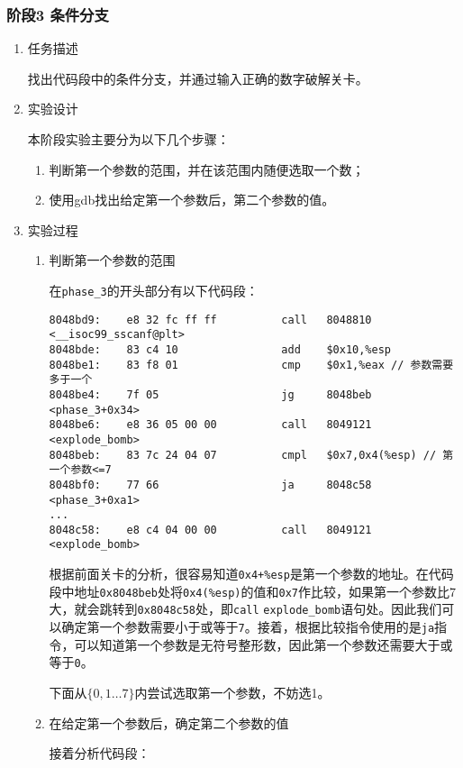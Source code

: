\documentclass{paper}
\begin{document}
\subsubsection{阶段3 条件分支}
\begin{enumerate}
\item 任务描述

找出代码段中的条件分支，并通过输入正确的数字破解关卡。

\item 实验设计

本阶段实验主要分为以下几个步骤：
\begin{enumerate}
\item 判断第一个参数的范围，并在该范围内随便选取一个数；
\item 使用gdb找出给定第一个参数后，第二个参数的值。
\end{enumerate}

\item 实验过程

\begin{enumerate}
\item 判断第一个参数的范围

在\verb|phase_3|的开头部分有以下代码段：
\begin{lstlisting}
8048bd9:	e8 32 fc ff ff       	call   8048810 <__isoc99_sscanf@plt>
8048bde:	83 c4 10             	add    $0x10,%esp
8048be1:	83 f8 01             	cmp    $0x1,%eax // 参数需要多于一个
8048be4:	7f 05                	jg     8048beb <phase_3+0x34>
8048be6:	e8 36 05 00 00       	call   8049121 <explode_bomb>
8048beb:	83 7c 24 04 07       	cmpl   $0x7,0x4(%esp) // 第一个参数<=7
8048bf0:	77 66                	ja     8048c58 <phase_3+0xa1>
...
8048c58:	e8 c4 04 00 00       	call   8049121 <explode_bomb>
\end{lstlisting}

根据前面关卡的分析，很容易知道\verb|0x4+%esp|是第一个参数的地址。在代码段中地址\verb|0x8048beb|处将\verb|0x4(%esp)|的值和\verb|0x7|作比较，如果第一个参数比7大，就会跳转到\verb|0x8048c58|处，即\verb|call| \verb|explode_bomb|语句处。因此我们可以确定第一个参数需要小于或等于\verb|7|。接着，根据比较指令使用的是\verb|ja|指令，可以知道第一个参数是无符号整形数，因此第一个参数还需要大于或等于\verb|0|。

下面从$\{0, 1\dots7\}$内尝试选取第一个参数，不妨选1。

\item 在给定第一个参数后，确定第二个参数的值

接着分析代码段：


\end{enumerate}
\end{enumerate}
\end{document}
